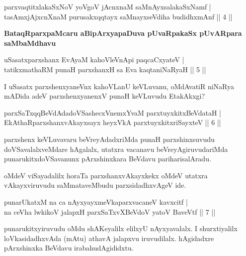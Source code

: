 
\begin{shl}
parxvaqtitxlakaSxNoV yoVgoV jAcnxnaM saMnAyxsalakaSxNamf |\\
tasAmxjAjxcnXnaM purusakxqqtayx saMnayxseVdiha budidhxmAnf \hfill || 4 ||
\end{shl}

\begin{artha}%
\textbf{BataqRparxpaMcaru aBipArxyapaDuva pUvaRpakaSx pUvARpara saMbaMdhavu}
\end{artha}

\begin{shl}
uSasatxparxshanx EvAyaM kahoVleVnApi paqcaCxyateV |\\
tatikxmathaRM punaH parxshanxH sa Eva kaqtaniNaRyaH \hfill || 5 ||
\end{shl}

\begin{artha}
I uSasatx parxshenxyaneVnx kahoVLanU keVLuvanu, oMdAvatiR niNaRya mADida adeV parxshenxyanenxV punaH keVLuvudu EtakAkxgi?
\end{artha}

\begin{shl}
parxSaTxqqBeVdAdadoVSashecxVnemxYvaM parxtuyxkitxBeVdataH |\\
EkAthaRparxshanxvAkayxsayx heyxVkA parxtuyxkitxriSayxteV \hfill || 6 ||
\end{shl}

\begin{artha}
parxshenx keVLuvavaru beVreyAdadxriMda punaH parxshinxsuvudu doVSavalalxveMdare hAgalalx, utatxra vacanavu beVreyAgiruvudariMda punarukitxdoVSavanunx pArxshinxkara BeVdavu pariharisalAradu.

oMdeV viSayadalilx horaTa parxshanxvAkayxkekx oMdeV utatxra vAkayxviruvudu saMmataveMbudu parxsidadhxvAgeV ide. 
\end{artha}

\begin{shl}
punarUkatxM na ca nAyxyayxmeVkaparxvacaneV kavxcitf |\\
na ceVha lwkikoV jalapxH parxSaTxvXBeVdoV yatoV BaveVtf \hfill || 7 ||
\end{shl}

\begin{artha}
punarukitxyiruvudu oMdu shAKeyalilx elilxyU nAyxyavalalx. I shurxtiyalilx loVkasidadhxvAda (mAtu) athavA jalapxvu iruvudilalx. hAgidadxre pArxshinxka BeVdavu irabahudAgididxtu.
\end{artha}

